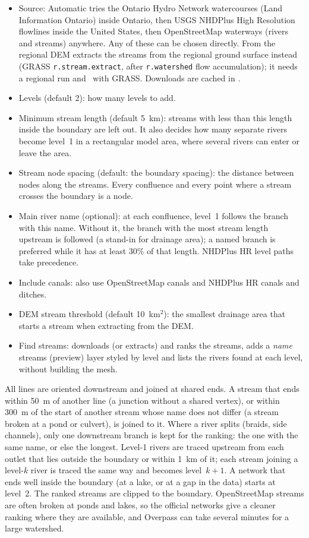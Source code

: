         \begin{itemize}
        \item {\sf Source}: {\sf Automatic} tries the Ontario Hydro Network watercourses (Land Information Ontario) inside Ontario, then USGS NHDPlus High Resolution flowlines inside the United States, then OpenStreetMap waterways (rivers and streams) anywhere.  Any of these can be chosen directly.  {\sf From the regional DEM} extracts the streams from the regional ground surface instead (GRASS {\tt r.stream.extract}, after {\tt r.watershed} flow accumulation); it needs a regional run and \qgis\ with GRASS.  Downloads are cached in .
        \item {\sf Levels} (default 2): how many levels to add.
        \item {\sf Minimum stream length} (default 5~km): streams with less than this length inside the boundary are left out.  It also decides how many separate rivers become level~1 in a rectangular model area, where several rivers can enter or leave the area.
        \item {\sf Stream node spacing} (default: the boundary spacing): the distance between nodes along the streams.  Every confluence and every point where a stream crosses the boundary is a node.
        \item {\sf Main river name} (optional): at each confluence, level~1 follows the branch with this name.  Without it, the branch with the most stream length upstream is followed (a stand-in for drainage area); a named branch is preferred while it has at least 30\% of that length.  NHDPlus HR level paths take precedence.
        \item {\sf Include canals}: also use OpenStreetMap canals and NHDPlus HR canals and ditches.
        \item {\sf DEM stream threshold} (default 10~km$^2$): the smallest drainage area that starts a stream when extracting from the DEM.
        \item {\sf Find streams}: downloads (or extracts) and ranks the streams, adds a {\sf \textit{name} streams (preview)} layer styled by level and lists the rivers found at each level, without building the mesh.
        \end{itemize}

        All lines are oriented downstream and joined at shared ends.  A stream that ends within 50~m of another line (a junction without a shared vertex), or within 300~m of the start of another stream whose name does not differ (a stream broken at a pond or culvert), is joined to it.  Where a river splits (braids, side channels), only one downstream branch is kept for the ranking: the one with the same name, or else the longest.  Level-1 rivers are traced upstream from each outlet that lies outside the boundary or within 1~km of it; each stream joining a level-$k$ river is traced the same way and becomes level~$k+1$.  A network that ends well inside the boundary (at a lake, or at a gap in the data) starts at level~2.  The ranked streams are clipped to the boundary.  OpenStreetMap streams are often broken at ponds and lakes, so the official networks give a cleaner ranking where they are available, and Overpass can take several minutes for a large watershed.

